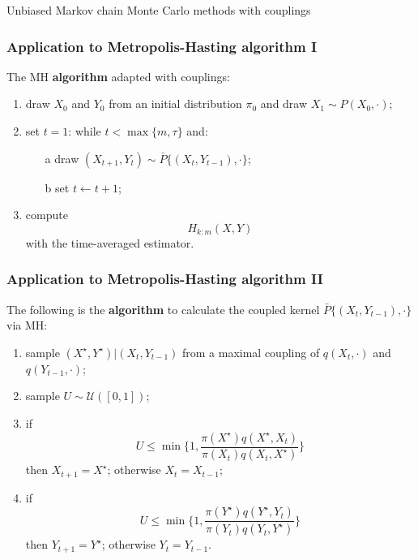 \documentclass{beamer}
\begin{document}
\begin{section}{Unbiased Markov chain Monte Carlo methods with couplings}
	\begin{frame}
	 	\frametitle{Application to Metropolis-Hasting algorithm I}
		The MH \textbf{algorithm} adapted with couplings:
	 	\vspace{0.3cm}
	 	\begin{enumerate}
	 		\item draw $X_0$ and $Y_0$ from an initial distribution $\pi_0$ and draw $X_1 \sim P(X_0, \cdot)$;
	 		\item set $t=1$: while $t<\max\{m,\tau\}$ and:
	 		\begin{itemize}
	 			\item[a] draw $(X_{t+1}, Y_t)\sim \bar P \{(X_t, Y_{t-1}), \cdot \}$;
	 			\item[b] set $t \leftarrow t+1$;
	 		\end{itemize}
	 		\item compute 
	 		$$ H_{k:m}(X,Y)$$
	 		with the time-averaged estimator.
	 	\end{enumerate}
	\end{frame}

	\begin{frame} 	
		\frametitle{Application to Metropolis-Hasting algorithm II}
	 	The following is the \textbf{algorithm} to calculate the coupled kernel $\bar P \{(X_t, Y_{t-1}), \cdot \}$ via MH:
	 	\begin{enumerate}
	 		\item sample $(X^\star, Y^\star) | (X_t, Y_{t-1})$ from a maximal coupling of $q(X_t, \cdot)$ and $q(Y_{t-1}, \cdot)$;
	 		\item sample $U \sim \mathcal{U}([0,1])$;
	 		\item if
	 		$$ U
	 		\leq \min\bigg \{
	 		1,
	 		\frac{ \pi(X^\star)q(X^\star,X_t)}{
	 			\pi(X_t)q(X_t, X^\star)}
	 		\bigg \}
	 		$$
	 		then $X_{t+1} = X^\star$; otherwise $X_t = X_{t-1}$;
	 		\item if
	 		$$ U
	 		\leq \min\bigg \{ 
	 		1,
	 		\frac{ \pi(Y^\star)q(Y^\star,Y_t)}{
	 			\pi(Y_t)q(Y_t, Y^\star)}
	 		\bigg \}
	 		$$
	 		then $Y_{t+1} = Y^\star$; otherwise $Y_t = Y_{t-1}$.
	 	\end{enumerate}
	\end{frame}

\end{section}
\end{document}
